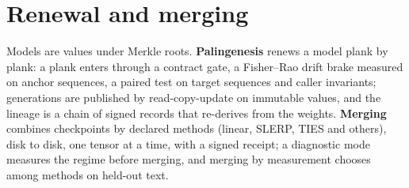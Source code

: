 \section{Renewal and merging}

Models are values under Merkle roots. \textbf{Palingenesis} renews a model plank by plank: a plank enters
through a contract gate, a Fisher--Rao drift brake measured on anchor sequences, a paired test on target
sequences and caller invariants; generations are published by read-copy-update on immutable values, and
the lineage is a chain of signed records that re-derives from the weights. \textbf{Merging} combines
checkpoints by declared methods (linear, SLERP, TIES and others), disk to disk, one tensor at a time,
with a signed receipt; a diagnostic mode measures the regime before merging, and merging by measurement
chooses among methods on held-out text.

